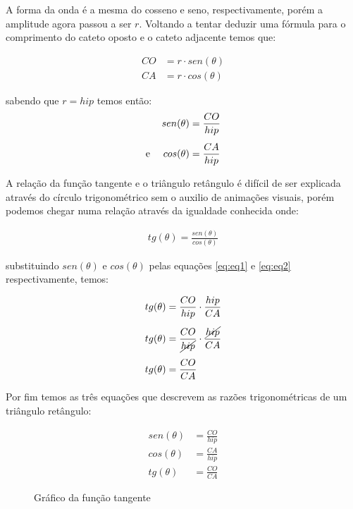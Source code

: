 \begin{multicols*}{2}
    A forma da onda é a mesma do cosseno e seno, respectivamente, porém a
    amplitude agora passou a ser $r$. Voltando a tentar deduzir uma fórmula para
    o comprimento do cateto oposto e o cateto adjacente temos que:

    \begin{align}
        CO & = r\cdot sen(\theta) \\
        CA & = r\cdot cos(\theta)
    \end{align}

    \noindent sabendo que $r=hip$ temos então:
    \begin{align}
        sen(\theta)                & = \frac{CO}{hip} \label{eq:eq1} \\[1ex]
        \text{e \quad} cos(\theta) & = \frac{CA}{hip} \label{eq:eq2}
    \end{align}

    A relação da função tangente e o triângulo retângulo é difícil de ser
    explicada através do círculo trigonométrico sem o auxilio de animações visuais,
    porém podemos chegar numa relação através da igualdade conhecida onde:

    \begin{align*}
        tg(\theta) = \frac{sen(\theta)}{cos(\theta)}
    \end{align*}

    \noindent substituindo $sen(\theta)$ e $cos(\theta)$ pelas equações
    \eqref{eq:eq1} e \eqref{eq:eq2} respectivamente, temos:

    \begin{align}
        tg(\theta) & = \frac{CO}{hip}\cdot\frac{hip}{CA}                   \\[1ex]
        tg(\theta) & = \frac{CO}{\cancel{hip}}\cdot\frac{\cancel{hip}}{CA} \\[1ex]
        tg(\theta) & = \frac{CO}{CA}
    \end{align}

    Por fim temos as três equações que descrevem as razões trigonométricas de um
    triângulo retângulo:

    \begin{align}
        sen(\theta) & = \frac{CO}{hip} \\[1ex]
        cos(\theta) & = \frac{CA}{hip} \\[1ex]
        tg(\theta)  & = \frac{CO}{CA}
    \end{align}

    \begin{figure}[H]
        \centering
        \caption{Gráfico da função tangente}
    \end{figure}


\end{multicols*}
